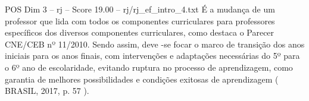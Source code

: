 \begin{textsample}{POS Dim 3 – rj – Score 19.00 – rj/rj\_ef\_intro\_4.txt}
É a mudança de um professor que lida com todos os componentes curriculares para professores específicos dos diversos componentes curriculares, como destaca o Parecer CNE/CEB nº 11/2010.
Sendo assim, deve -se focar o marco de transição dos anos iniciais para os anos finais, com intervenções e adaptações necessárias do 5º para o 6º ano de escolaridade, evitando ruptura no processo de aprendizagem, como garantia de melhores possibilidades e condições exitosas de aprendizagem ( BRASIL, 2017, p. 57 ).

\end{textsample}
